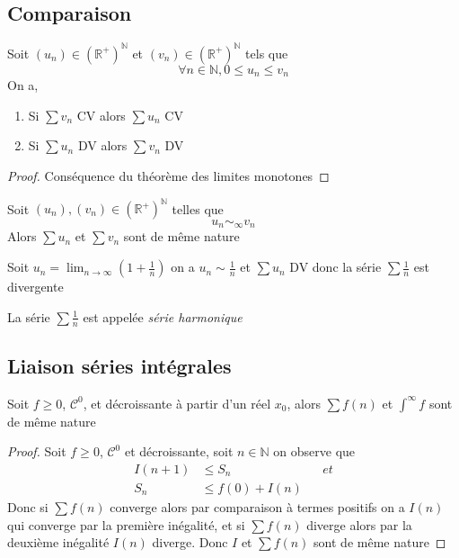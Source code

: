 \documentclass[11pt,colorlinks]{book}
\theoremstyle{mytheoremstyle}
\theoremstyle{mytheoremstyle}
\theoremstyle{mytheoremstyle}
\theoremstyle{mytheoremstyle}
\theoremstyle{mytheoremstyle}
\theoremstyle{mytheoremstyle}
\theoremstyle{mytheoremstyle}
\theoremstyle{mytheoremstyle}
\theoremstyle{myproblemstyle}
\def\mbb#1{\mathbb{#1}}
\def\bN{\mbb{N}}
\def\bR{\mbb{R}}
\def\mC{\mathcal{C}}
\def\ln{\lim_{n \to \infty}}
\def\rNp{\left(\bR^{+}\right)^{\bN}}
\renewcommand{\equiv}{\sim}
\begin{document}
\subsection{Comparaison}
\begin{theorem}
  Soit $(u_n) \in \rNp$ et $(v_n) \in \rNp$ tels que 
  \begin{equation*}
    \forall n \in \bN, 0 \leq u_n \leq v_n
  \end{equation*}
  On a,
  \begin{enumerate}
    \item Si $\sum v_n$ CV alors $\sum u_n$ CV
    \item Si $\sum u_n$ DV alors $\sum v_n$ DV
  \end{enumerate}
  \begin{proof}
    Conséquence du théorème des limites monotones 
  \end{proof}
\end{theorem}
\begin{prop}
  Soit $(u_n),(v_n) \in \rNp$ telles que 
  \begin{equation*}
    u_n \equiv_{\infty} v_n
  \end{equation*}
  Alors $\sum u_n$ et $\sum v_n$ sont de même nature
\end{prop}
\begin{ex}
  Soit $u_n = \ln \left(1 + \frac{1}{n}\right)$ on a $u_n \equiv \frac{1}{n}$ et $\sum u_n$ DV donc la série 
  $\sum \frac{1}{n}$ est divergente
  \begin{rmq}
    La série $\sum \frac{1}{n}$ est appelée \textit{série harmonique}
  \end{rmq}
\end{ex}

\subsection{Liaison séries intégrales}
\begin{theorem}
  Soit $f\geq 0$, $\mC^0$, et décroissante à partir d'un réel $x_0$, alors $\sum f(n)$ et $\int^{\infty} f$ sont de même nature
  \begin{proof}
    Soit $f\geq 0$, $\mC^0$ et décroissante, soit $n \in \bN$ on observe que 
    \begin{align*}
      I(n+1) &\leq S_n && {et} \\ 
      S_n &\leq f(0) + I(n)
    \end{align*}
    Donc si $\sum f(n)$ converge alors par comparaison à termes positifs on a $I(n)$ qui converge par la première inégalité, et 
    si $\sum f(n)$ diverge alors par la deuxième inégalité $I(n)$ diverge. Donc $I$ et $\sum f(n)$ sont de même nature
  \end{proof}
\end{theorem}
\end{document}
